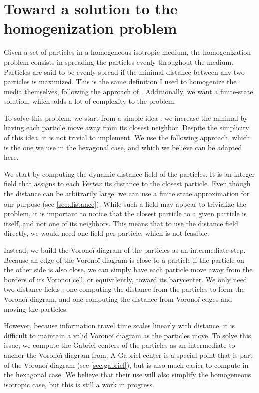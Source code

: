 \documentclass[11pt,a4paper]{report}
\begin{document}
\section{Toward a solution to the homogenization problem}

Given a set of particles in a homogeneous isotropic medium, the homogenization problem consists in spreading the particles evenly throughout the medium. Particles are said to be evenly spread if the minimal distance between any two particles is maximized. This is the same definition I used to homogenize the media themselves, following the approach of \cite{fpo}. Additionally, we want a finite-state solution, which adds a lot of complexity to the problem.

To solve this problem, we start from a simple idea : we increase the minimal by having each particle move away from its closest neighbor. Despite the simplicity of this idea, it is not trivial to implement. We use the following approach, which is the one we use in the hexagonal case, and which we believe can be adapted here.

We start by computing the dynamic distance field of the particles. It is an integer field that assigns to each $Vertex$ its distance to the closest particle. Even though the distance can be arbitrarily large, we can use a finite state approximation for our purpose (see \ref{sec:distance}). While such a field may appear to trivialize the problem, it is important to notice that the closest particle to a given particle is itself, and not one of its neighbors. This means that to use the distance field directly, we would need one field per particle, which is not feasible.

Instead, we build the Voronoï diagram of the particles as an intermediate step. Because an edge of the Voronoï diagram is close to a particle if the particle on the other side is also close, we can simply have each particle move away from the borders of its Voronoï cell, or equivalently, toward its barycenter. We only need two distance fields : one computing the distance from the particles to form the Voronoï diagram, and one computing the distance from Voronoï edges and moving the particles.

However, because information travel time scales linearly with distance, it is difficult to maintain a valid Voronoï diagram as the particles move. To solve this issue, we compute the Gabriel centers of the particles as an intermediate to anchor the Voronoï diagram from. A Gabriel center is a special point that is part of the Voronoï diagram (see \ref{sec:gabriel}), but is also much easier to compute in the hexagonal case. We believe that their use will also simplify the homogeneous isotropic case, but this is still a work in progress.
\end{document}
